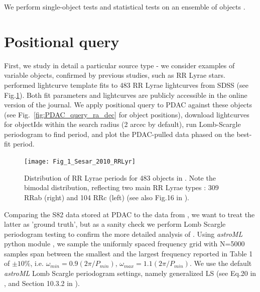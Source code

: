 \documentclass[fleqn,usenatbib]{mnras} %
\begin{document}
We perform single-object tests and statistical tests on an ensemble of objects . 


\section{Positional query}
First, we study in detail a particular source type - we consider examples of variable objects, confirmed by previous studies, such as RR Lyrae stars. \cite{sesar2010}  performed lightcurve template fits to 483 RR Lyrae lightcurves from SDSS (see Fig.\ref{fig:RRLyr_distribution}). Both fit parameters and lightcurves are publicly accessible in the online version of the journal. We apply positional  query to PDAC against these objects (see Fig.~\ref{fig:PDAC_query_ra_dec} for object positions), download lightcurves for objectIds  within the search radius (2 arcec by default), run Lomb-Scargle periodogram to find period, and plot the PDAC-pulled data phased on the best-fit period. 

\begin{figure}
\texttt{[image: Fig\_1\_Sesar\_2010\_RRLyr]}
\caption{ Distribution of RR Lyrae periods  for 483 objects in \citep{sesar2010}. Note the bimodal distribution, reflecting two main RR Lyrae types : 309 RRab (right) and 104 RRc (left) (see also Fig.16 in \citep{sesar2010}).}
\label{fig:RRLyr_distribution}
\end{figure}


Comparing the S82 data stored at PDAC to the data from \cite{sesar2010},  we want to treat the latter as 'ground truth', but as a sanity check we perform Lomb Scargle periodogram testing to confirm the more detailed analysis of \cite{sesar2010}. Using {\it astroML} python module \citep{astroML}, we sample the uniformly spaced frequency grid with N=5000 samples span between the smallest and the largest frequency reported in Table 1 of \cite{sesar2010} $\pm 10\%$, i.e. $\omega_{min} = 0.9 ( 2 \pi / P_{min})$, $\omega_{max} = 1.1 ( 2 \pi / P_{min})$. We use the default {\it astroML} Lomb Scargle periodogram settings, namely generalized LS (see Eq.20 in \cite{zechmeister2009}, and Section 10.3.2 in \cite{ivezic2014}).   
\end{document}
